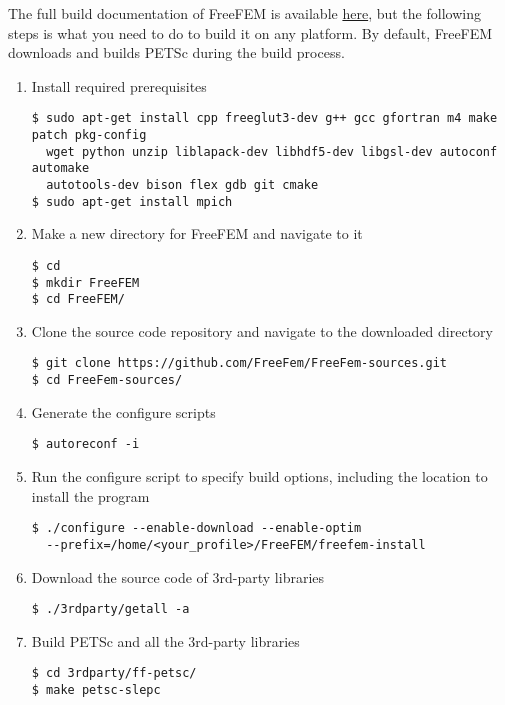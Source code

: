 The full build documentation of FreeFEM is available \href{https://doc.freefem.org/introduction/installation.html}{here}, but the following steps is what you need to do to build it on any platform. By default, FreeFEM downloads and builds PETSc during the build process.

\begin{enumerate}
\item Install required prerequisites
\begin{verbatim}
$ sudo apt-get install cpp freeglut3-dev g++ gcc gfortran m4 make patch pkg-config
  wget python unzip liblapack-dev libhdf5-dev libgsl-dev autoconf automake 
  autotools-dev bison flex gdb git cmake
$ sudo apt-get install mpich
\end{verbatim}

\item Make a new directory for FreeFEM and navigate to it
\begin{verbatim}
$ cd
$ mkdir FreeFEM
$ cd FreeFEM/
\end{verbatim}

\item Clone the source code repository and navigate to the downloaded directory
\begin{verbatim}
$ git clone https://github.com/FreeFem/FreeFem-sources.git
$ cd FreeFem-sources/
\end{verbatim}

\item Generate the configure scripts
\begin{verbatim}
$ autoreconf -i
\end{verbatim}

\item Run the configure script to specify build options, including the location to install the program
\begin{verbatim}
$ ./configure --enable-download --enable-optim 
  --prefix=/home/<your_profile>/FreeFEM/freefem-install
\end{verbatim}

\item Download the source code of 3rd-party libraries
\begin{verbatim}
$ ./3rdparty/getall -a
\end{verbatim}

\item Build PETSc and all the 3rd-party libraries
\begin{verbatim}
$ cd 3rdparty/ff-petsc/
$ make petsc-slepc
\end{verbatim}


\end{enumerate}
